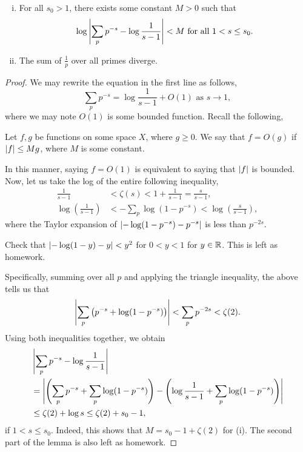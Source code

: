 \begin{lemma}
    \begin{enumerate}[(i)]
        \item For all $s_0 > 1$, there exists some constant $M > 0$ such that 
        \[ \log \left\lvert \sum_p p^{-s} - \log \frac{1}{s-1} \right\rvert < M \text{ for all } 1 < s \leq s_0. \]
        \item The sum of $\frac{1}{p}$ over all primes diverge.
    \end{enumerate}
\end{lemma}
\begin{proof}
    We may rewrite the equation in the first line as follows,
    \[ \sum_p p^{-s} = \log \frac{1}{s-1} + O(1) \text{ as } s \to 1, \]
    where we may note $O(1)$ is some bounded function. Recall the following,
    \begin{definition}
        Let $f, g$ be functions on some space $X$, where $g \geq 0$. We say that $f = O(g)$ if $\left\lvert f \right\rvert \leq M g$, where $M$ is some constant.
    \end{definition}
    \noindent In this manner, saying $f = O(1)$ is equivalent to saying that $\left\lvert f \right\rvert$ is bounded. Now, let us take the log of the entire following inequality,
    \begin{align*}
        \frac{1}{s-1} &< \zeta(s) < 1 + \frac{1}{s-1} = \frac{s}{s-1}, \\
        \log \left(\frac{1}{s-1}\right) &< - \sum_p \log(1 - p^{-s}) < \log \left(\frac{s}{s-1}\right), \tag{$\ast$}
    \end{align*}
    where the Taylor expansion of $\left\lvert - \log(1 - p^{-s}) - p^{-s} \right\rvert$ is less than $p^{-2s}$.
    \begin{exercise}
        Check that $\left\lvert - \log(1 - y) - y \right\rvert < y^2$ for $0 < y < 1$ for $y \in \mathbb R$. This is left as homework.
    \end{exercise}
    \noindent Specifically, summing over all $p$ and applying the triangle inequality, the above tells us that
    \[ \left\lvert \sum_p \left(p^{-s} + \log(1 - p^{-s})\right) \right\rvert < \sum_p p^{-2s} < \zeta(2). \]
    Using both inequalities together, we obtain
    \begin{align*}
        & \left\lvert \sum_p p^{-s} - \log \frac{1}{s-1} \right\rvert \\
        &= \left\lvert \left(\sum_p p^{-s} + \sum_p \log (1 - p^{-s})\right) - \left(\log \frac{1}{s-1} + \sum_p \log (1 - p^{-s})\right) \right\rvert \\
        &\leq \zeta(2) + \log s \leq \zeta(2) + s_0 - 1,
    \end{align*}
    if $1 < s \leq s_0$. Indeed, this shows that $M = s_0 - 1 + \zeta(2)$ for (i). The second part of the lemma is also left as homework.
\end{proof}
